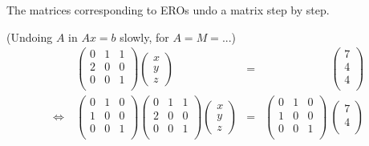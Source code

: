 \noindent
The matrices corresponding to EROs undo a matrix step by step.
\begin{example} \label{slowly}(\hypertarget{Undoing}{Undoing} $A$ in $Ax=b$ slowly, for $A=M=...$)
\begin{equation*}
\begin{array}{crcr}
& \begin{pmatrix}
0 & 1 & 1  \\ 
2 & 0 & 0 \\
0& 0 & 1  \\
\end{pmatrix} 
\begin{pmatrix}
 x \\ 
y \\
z 
\end{pmatrix} 
&=&
\phantom{
\begin{pmatrix}
0 & 1 & 0  \\ 
1 & 0 & 0 \\
0& 0 & 1  \\
\end{pmatrix} 
}
~
\begin{pmatrix}
 7 \\ 
4 \\
4\\
\end{pmatrix} 
\\[7mm] %
\Leftrightarrow\ &
%
\begin{pmatrix}
0 & 1 & 0  \\ 
1 & 0 & 0 \\
0& 0 & 1  \\
\end{pmatrix} 
%
\begin{pmatrix}
0 & 1 & 1  \\ 
2 & 0 & 0 \\
0& 0 & 1  \\
\end{pmatrix} 
\begin{pmatrix}
 x \\ 
y \\
z 
\end{pmatrix} 
&=&
\begin{pmatrix}
0 & 1 & 0  \\ 
1 & 0 & 0 \\
0& 0 & 1  \\
\end{pmatrix} 
~
\begin{pmatrix}
 7 \\ 
4 \\

\end{pmatrix}
\end{array}
\end{equation*}
\end{example}
